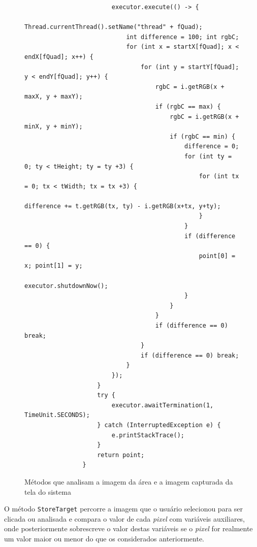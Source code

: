 \documentclass[tg]{mdtufsm}
\begin{document}
\begin{figure}[!htb]
\begin{lstlisting}
                        executor.execute(() -> {
                            Thread.currentThread().setName("thread" + fQuad);
                            int difference = 100; int rgbC;
                            for (int x = startX[fQuad]; x < endX[fQuad]; x++) {
                                for (int y = startY[fQuad]; y < endY[fQuad]; y++) {
                                    rgbC = i.getRGB(x + maxX, y + maxY);
                                    if (rgbC == max) {
                                        rgbC = i.getRGB(x + minX, y + minY);
                                        if (rgbC == min) {
                                            difference = 0;
                                            for (int ty = 0; ty < tHeight; ty = ty +3) {
                                                for (int tx = 0; tx < tWidth; tx = tx +3) {
                                                    difference += t.getRGB(tx, ty) - i.getRGB(x+tx, y+ty);
                                                }
                                            }
                                            if (difference == 0) {
                                                point[0] = x; point[1] = y;
                                                executor.shutdownNow();
                                            }
                                        }
                                    }
                                    if (difference == 0) break;
                                }
                                if (difference == 0) break;
                            }
                        });
                    }
                    try {
                        executor.awaitTermination(1, TimeUnit.SECONDS);
                    } catch (InterruptedException e) {
                        e.printStackTrace();
                    }
                    return point;
                }
                \end{lstlisting}
                    \caption{Métodos que analisam a imagem da área e a imagem capturada da tela do sistema}
                	\label{code:ImageSearch.java}
                \end{figure}

                O método \texttt{StoreTarget} percorre a imagem que o usuário selecionou para ser clicada ou analisada e compara o valor de cada \emph{pixel} com variáveis auxiliares, onde posteriormente sobrescreve o valor destas variáveis se o \emph{pixel} for realmente um valor maior ou menor do que os considerados anteriormente.
\end{document}
